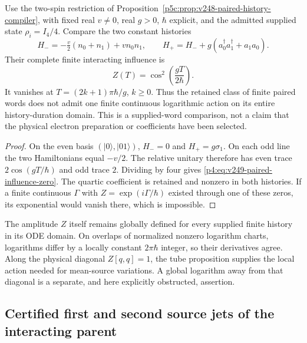 \documentclass[12pt,a4paper]{article}
\begin{document}
\begin{proposition}
\label{p4:prop:v249-paired-influence-zero}
Use the two-spin restriction of
Proposition~\ref{p5c:prop:v248-paired-history-compiler}, with fixed real
$v\ne0$, real $g>0$, $\hbar$ explicit, and the admitted supplied state
$\rho_i=I_4/4$. Compare the two constant histories
\[
 H_-=-\tfrac v2(n_0+n_1)+v n_0n_1,
 \qquad H_+=H_-+g(a_0^\dagger a_1^\dagger+a_1a_0).
\]
Their complete finite interacting influence is
\begin{equation}
 \boxed{Z(T)=\cos^2\!\left(\frac{gT}{2\hbar}\right).}
 \label{p4:eq:v249-paired-influence-zero}
\end{equation}
It vanishes at $T=(2k+1)\pi\hbar/g$, $k\ge0$. Thus the retained class of
finite paired words does not admit one finite continuous logarithmic action
on its entire history-duration domain. This is a supplied-word comparison,
not a claim that the physical electron preparation or coefficients have
been selected.
\end{proposition}
\begin{proof}
On the even basis $(|0\rangle,|01\rangle)$, $H_-=0$ and
$H_+=g\sigma_1$. On each odd line the two Hamiltonians equal $-v/2$.
The relative unitary therefore has even trace $2\cos(gT/\hbar)$ and odd
trace $2$. Dividing by four gives \eqref{p4:eq:v249-paired-influence-zero}.
The quartic coefficient is retained and nonzero in both histories.
If a finite continuous $\Gamma$ with
$Z=\exp(i\Gamma/\hbar)$ existed through one of these zeros, its exponential
would vanish there, which is impossible.
\end{proof}

The amplitude $Z$ itself remains globally defined for every supplied finite
history in its ODE domain. On overlaps of normalized nonzero logarithm
charts, logarithms differ by a locally constant $2\pi\hbar$ integer, so
their derivatives agree. Along the physical diagonal $Z[q,q]=1$, the tube
proposition supplies the local action needed for mean-source variations.
A global logarithm away from that diagonal is a separate, and here
explicitly obstructed, assertion.


\subsection{Certified first and second source jets of the interacting parent}
\label{p4:sec:v249-interacting-jet-convergence}
\end{document}
